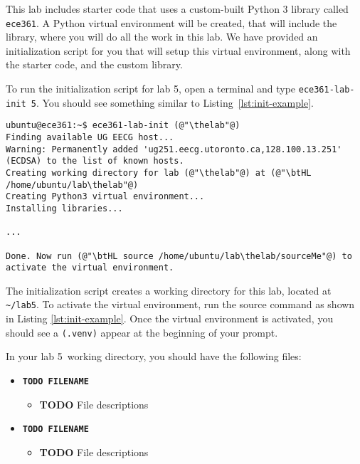 \documentclass[11pt]{article}
\def\thelab{5}
\begin{document}
This lab includes starter code that uses a custom-built Python 3 library called \texttt{ece361}.
A Python virtual environment will be created, that will include the library, where you will do all the work in this lab.
We have provided an initialization script for you that will setup this virtual environment, along with the starter code, and the custom library.


To run the initialization script for lab \thelab, open a terminal and type \texttt{ece361-lab-init \thelab}.
You should see something similar to Listing~\ref{lst:init-example}.

\begin{lstlisting}[style=ece361shell, caption={Initializing lab \thelab.}, label={lst:init-example}]
ubuntu@ece361:~$ ece361-lab-init (@"\thelab"@)
Finding available UG EECG host...
Warning: Permanently added 'ug251.eecg.utoronto.ca,128.100.13.251' (ECDSA) to the list of known hosts.
Creating working directory for lab (@"\thelab"@) at (@"\btHL /home/ubuntu/lab\thelab"@)
Creating Python3 virtual environment...
Installing libraries...

...

Done. Now run (@"\btHL source /home/ubuntu/lab\thelab/sourceMe"@) to activate the virtual environment.
\end{lstlisting}

The initialization script creates a working directory for this lab, located at \texttt{\textasciitilde/lab\thelab}.
To activate the virtual environment, run the source command as shown in Listing \ref{lst:init-example}.
Once the virtual environment is activated, you should see a \texttt{(.venv)} appear at the beginning of your prompt.



In your lab \thelab~working directory, you should have the following files:
\begin{itemize}
    \item \texttt{\textbf{TODO FILENAME}}
        \begin{itemize}
            \item \textbf{TODO} File descriptions
        \end{itemize}

    \item \texttt{\textbf{TODO FILENAME}}
        \begin{itemize}
            \item \textbf{TODO} File descriptions
        \end{itemize}
\end{itemize}
\end{document}
